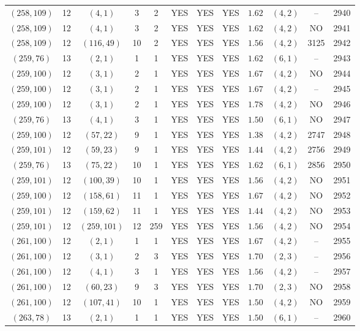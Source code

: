 \begin{longtable}{|c|c|c|c|c|c|c|c|c|c|c|c|}
$(258,109)$ & 12 & $(4,1)$ & 3 & 2 & YES & YES & YES & $1.62$ & $(4,2)$ & -- & 2940\\
$(258,109)$ & 12 & $(4,1)$ & 3 & 2 & YES & YES & YES & $1.62$ & $(4,2)$ & NO & 2941\\
$(258,109)$ & 12 & $(116,49)$ & 10 & 2 & YES & YES & YES & $1.56$ & $(4,2)$ & 3125 & 2942\\
$(259,76)$ & 13 & $(2,1)$ & 1 & 1 & YES & YES & YES & $1.62$ & $(6,1)$ & -- & 2943\\
$(259,100)$ & 12 & $(3,1)$ & 2 & 1 & YES & YES & YES & $1.67$ & $(4,2)$ & NO & 2944\\
$(259,100)$ & 12 & $(3,1)$ & 2 & 1 & YES & YES & YES & $1.67$ & $(4,2)$ & -- & 2945\\
$(259,100)$ & 12 & $(3,1)$ & 2 & 1 & YES & YES & YES & $1.78$ & $(4,2)$ & NO & 2946\\
$(259,76)$ & 13 & $(4,1)$ & 3 & 1 & YES & YES & YES & $1.50$ & $(6,1)$ & NO & 2947\\
$(259,100)$ & 12 & $(57,22)$ & 9 & 1 & YES & YES & YES & $1.38$ & $(4,2)$ & 2747 & 2948\\
$(259,101)$ & 12 & $(59,23)$ & 9 & 1 & YES & YES & YES & $1.44$ & $(4,2)$ & 2756 & 2949\\
$(259,76)$ & 13 & $(75,22)$ & 10 & 1 & YES & YES & YES & $1.62$ & $(6,1)$ & 2856 & 2950\\
$(259,101)$ & 12 & $(100,39)$ & 10 & 1 & YES & YES & YES & $1.56$ & $(4,2)$ & NO & 2951\\
$(259,100)$ & 12 & $(158,61)$ & 11 & 1 & YES & YES & YES & $1.67$ & $(4,2)$ & NO & 2952\\
$(259,101)$ & 12 & $(159,62)$ & 11 & 1 & YES & YES & YES & $1.44$ & $(4,2)$ & NO & 2953\\
$(259,101)$ & 12 & $(259,101)$ & 12 & 259 & YES & YES & YES & $1.56$ & $(4,2)$ & NO & 2954\\
$(261,100)$ & 12 & $(2,1)$ & 1 & 1 & YES & YES & YES & $1.67$ & $(4,2)$ & -- & 2955\\
$(261,100)$ & 12 & $(3,1)$ & 2 & 3 & YES & YES & YES & $1.70$ & $(2,3)$ & -- & 2956\\
$(261,100)$ & 12 & $(4,1)$ & 3 & 1 & YES & YES & YES & $1.56$ & $(4,2)$ & -- & 2957\\
$(261,100)$ & 12 & $(60,23)$ & 9 & 3 & YES & YES & YES & $1.70$ & $(2,3)$ & NO & 2958\\
$(261,100)$ & 12 & $(107,41)$ & 10 & 1 & YES & YES & YES & $1.50$ & $(4,2)$ & NO & 2959\\
$(263,78)$ & 13 & $(2,1)$ & 1 & 1 & YES & YES & YES & $1.50$ & $(6,1)$ & -- & 2960\\

\end{longtable}
